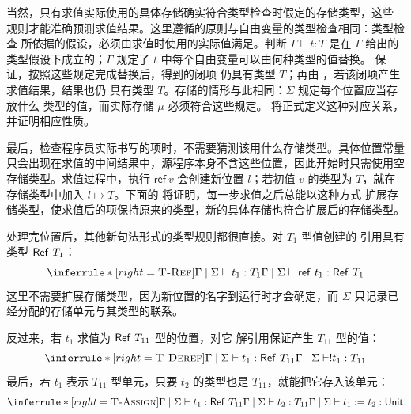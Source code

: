 当然，只有求值实际使用的具体存储确实符合类型检查时假定的存储类型，这些
规则才能准确预测求值结果。这里遵循的原则与自由变量的类型检查相同：类型检查
所依据的假设，必须由求值时使用的实际值满足。判断
\(\Gamma\vdash t:T\) 是在 \(\Gamma\) 给出的类型假设下成立的；\(\Gamma\)
规定了 \(t\) 中每个自由变量可以由何种类型的值替换。
保证，按照这些规定完成替换后，得到的闭项
仍具有类型 \(T\)；再由
，若该闭项产生求值结果，结果也仍
具有类型 \(T\)。存储的情形与此相同：\(\Sigma\) 规定每个位置应当存放什么
类型的值，而实际存储 \(\mu\) 必须符合这些规定。
将正式定义这种对应关系，并证明相应性质。

最后，检查程序员实际书写的项时，不需要猜测该用什么存储类型。具体位置常量
只会出现在求值的中间结果中，源程序本身不含这些位置，因此开始时只需使用空
存储类型。求值过程中，执行 \(\mathsf{ref}\ v\) 会创建新位置 \(l\)；若初值
\(v\) 的类型为 \(T\)，就在存储类型中加入 \(l\mapsto T\)。下面的
将证明，每一步求值之后总能以这种方式
扩展存储类型，使求值后的项保持原来的类型，新的具体存储也符合扩展后的存储类型。

处理完位置后，其他新句法形式的类型规则都很直接。对 \(T_1\) 型值创建的
引用具有类型 \(\tapltype{Ref}\ T_1\)：
\[
\inferrule*[right=\textsc{T-Ref}]
 {\Gamma\mid\Sigma\vdash t_1:T_1}
 {\Gamma\mid\Sigma\vdash\mathsf{ref}\ t_1:\tapltype{Ref}\ T_1}
\]
这里不需要扩展存储类型，因为新位置的名字到运行时才会确定，而 \(\Sigma\)
只记录已经分配的存储单元与其类型的联系。

反过来，若 \(t_1\) 求值为 \(\mathsf{Ref}\ T_{11}\) 型的位置，对它
解引用保证产生 \(T_{11}\) 型的值：
\[
\inferrule*[right=\textsc{T-Deref}]
 {\Gamma\mid\Sigma\vdash t_1:\tapltype{Ref}\ T_{11}}
 {\Gamma\mid\Sigma\vdash!t_1:T_{11}}
\]
最后，若 \(t_1\) 表示 \(T_{11}\) 型单元，只要 \(t_2\) 的类型也是
\(T_{11}\)，就能把它存入该单元：
\[
\inferrule*[right=\textsc{T-Assign}]
 {\Gamma\mid\Sigma\vdash t_1:\tapltype{Ref}\ T_{11}\\
  \Gamma\mid\Sigma\vdash t_2:T_{11}}
 {\Gamma\mid\Sigma\vdash t_1:=t_2:\tapltype{Unit}}
\]

